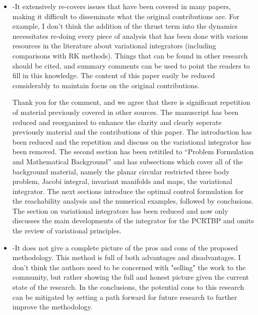 \documentclass[11pt]{article}
\begin{document}
\begin{itemize}
    \item 
        \begin{itshape}
-It extensively re-covers issues that have been covered in many papers, making it difficult to disseminate what the original contributions are.  For example, I don't think the addition of the thrust term into the dynamics necessitates re-doing every piece of analysis that has been done with various resources in the literature about variational integrators (including comparisons with RK methods).  Things that can be found in other research should be cited, and summary comments can be used to point the readers to fill in this knowledge.  The content of this paper easily be reduced considerably to maintain focus on the original contributions.
    \end{itshape}

    Thank you for the comment, and we agree that there is significant repetition of material previously covered in other sources.
    The manuscript has been reduced and reorganized to enhance the clarity and clearly seperate previously material and the contributions of this paper.
    The introduction has been reduced and the repetition and discuss on the variational integrator has been removed.
    The second section has been retitiled to ``Problem Formulation and Mathematical Background'' and has subsections which cover all of the background material, namely the planar circular restricted three body problem, Jacobi integral, invariant manifolds and \Poincare maps, the variational integrator.
The next sections introduce the optimal control formulation for the reachability analysis and the numerical examples, followed by conclusions.
The section on variational integrators has been reduced and now only discusses the main developments of the integrator for the PCRTBP and omits the review of variational principles.

\item
    \begin{itshape}
-It does not give a complete picture of the pros and cons of the proposed methodology.  This method is full of both advantages and disadvantages.  I don't think the authors need to be concerned with "selling" the work to the community, but rather showing the full and honest picture given the current state of the research.  In the conclusions, the potential cons to this research can be mitigated by setting a path forward for future research to further improve the methodology.


\end{itshape}
\end{itemize}
\end{document}
